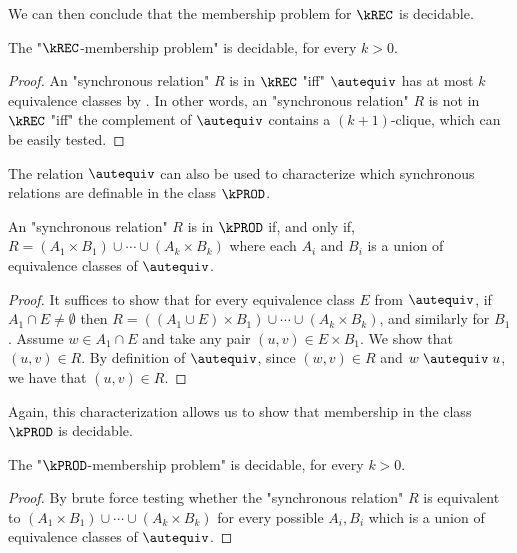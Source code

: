 We can then conclude that the membership problem for $\kREC$ is decidable. 

\begin{corollary}
    The "$\kREC$-membership problem" is decidable, for every $k > 0$.
\end{corollary}
\begin{proof}
    An "synchronous relation" $R$ is in $\kREC$ "iff" $\autequiv$ has at most $k$ equivalence classes by . 
    In other words, an "synchronous relation" $R$ is not in $\kREC$ "iff" the complement of $\autequiv$ contains a $(k+1)$-clique, which can be easily tested.
\end{proof}

The relation $\autequiv$ can also be used to characterize which synchronous relations are definable in the class $\kPROD$.

\begin{lemma}
    An "synchronous relation" $R$ is in $\kPROD$ if, and only if, $R=(A_1 \times B_1) \cup \dotsb \cup (A_k \times B_k)$ where each $A_i$ and $B_i$ is a union of equivalence classes of $\autequiv$.
\end{lemma}
\begin{proof}
    It suffices to show that for every equivalence class $E$ from $\autequiv$, if $A_1 \cap E \neq \emptyset$ then $R = ((A_1 \cup E) \times B_1) \cup \dotsb \cup (A_k \times B_k)$, and similarly for $B_1$. Assume $w \in A_1 \cap E$ and take any pair $(u,v) \in E \times B_1$. We show that $(u,v) \in R$. By definition of $\autequiv$, since $(w,v) \in R$ and $w \mathrel{\autequiv} u$, we have that $(u,v) \in R$.
\end{proof}

Again, this characterization allows us to show that membership in the class $\kPROD$ is decidable. 

\begin{corollary}
    The "$\kPROD$-membership problem" is decidable, for every $k > 0$.
\end{corollary}

\begin{proof}
    By brute force testing whether the "synchronous relation" $R$ is equivalent to $(A_1 \times B_1) \cup \dotsb \cup (A_k \times B_k)$ for every possible $A_i,B_i$ which is a union of equivalence classes of $\autequiv$.
\end{proof}
